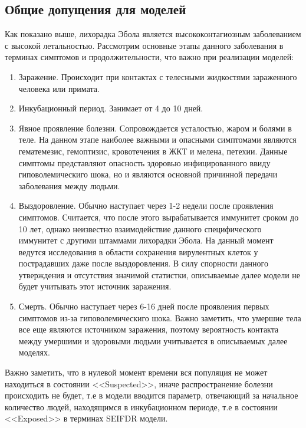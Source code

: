 \subsection{Общие допущения для моделей}
Как показано выше, лихорадка Эбола является высококонтагиозным заболеванием с высокой летальностью. Рассмотрим основные этапы данного заболевания в терминах симптомов и продолжительности, что важно при реализации моделей:
\begin{enumerate}
	\item Заражение. Происходит при контактах с телесными жидкостями зараженного человека или примата.
	\item Инкубационный период. Занимает от 4 до 10 дней. %
	\item Явное проявление болезни. Сопровождается усталостью, жаром и болями в теле. На данном этапе наиболее важными  и опасными симптомами являются гематемезис, гемоптизис, кровотечения в ЖКТ и мелена, петехии. Данные симптомы представляют опасность здоровью инфицированного ввиду гиповолемическиго шока, но и являются основной причинной передачи заболевания между людьми. %
	\item Выздоровление. Обычно наступает через 1-2 недели после проявления симптомов. %
	Считается, что после этого вырабатывается иммунитет сроком до 10 лет, однако неизвестно взаимодействие данного специфического иммунитет с другими штаммами лихорадки Эбола. %
	На данный момент ведутся исследования в области сохранения вирулентных клеток у пострадавших даже после выздоровления. В силу спорности данного утверждения и отсутствия значимой статистки, описываемые далее модели не будет учитывать этот источник заражения. %
	\item Смерть. Обычно наступает через 6-16 дней после проявления первых симптомов из-за гиповолемическиго шока. %
	Важно заметить, что умершие тела все еще являются источником заражения, поэтому вероятность контакта между умершими и здоровыми людьми учитывается в описываемых далее моделях.
\end{enumerate}
Важно заметить, что в нулевой момент времени вся популяция не  может находиться в состоянии <<Suspected>>, иначе распространение болезни происходить не будет, т.е в модели вводится параметр, отвечающий за начальное количество людей, находящимся в инкубационном периоде, т.е в состоянии <<Exposed>>  в терминах SEIFDR модели.   
